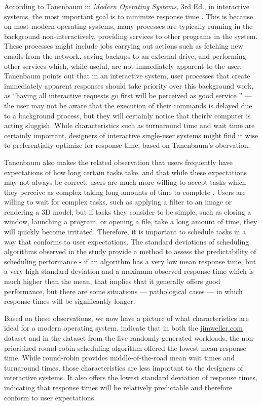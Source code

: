\documentclass[12pt,letterpaper]{article}
\begin{document}
  			According to Tanenbaum in \textit{Modern Operating Systems}, 3rd Ed., in interactive systems, the most important goal is to minimize response time \cite{tanenbaum2007modern}. This is because on most modern operating systems, many processes are typically running in the background non-interactively, providing services to other programs in the system. These processes might include jobs carrying out actions such as fetching new emails from the network, saving backups to an external drive, and performing other services which, while useful, are not immediately apparent to the user. Tanenbaum points out that in an interactive system, user processes that create immediately apparent responses should take priority over this background work, as ``having all interactive requests go first will be perceived as good service \cite{tanenbaum2007modern}'' --- the user may not be aware that the execution of their commands is delayed due to a background process, but they will certainly notice that theirlv computer is acting sluggish. While characteristics such as turnaround time and wait time are certainly important, designers of interactive single-user systems might find it wise to preferentially optimize for response time, based on Tanenbaum's obervation.

  			Tanenbaum also makes the related observation that users frequently have expectations of how long certain tasks take, and that while these expectations may not always be correct, users are much more willing to accept tasks which they perceive as complex taking long amounts of time to complete \cite{tanenbaum2007modern}. Users are willing to wait for complex tasks, such as applying a filter to an image or rendering a 3D model, but if tasks they consider to be simple, such as closing a window, launching a program, or opening a file, take a long amount of time, they will quickly become irritated. Therefore, it is important to schedule tasks in a way that conforms to user expectations. The standard deviations of scheduling algorithms observed in the study provide a method to assess the predictability of scheduling performance - if an algorithm has a very low mean response time, but a very high standard deviation and a maximum observed response time which is much higher than the mean, that implies that it generally offers good performance, but there are some situations --- pathological cases --- in which response times will be significantly longer.

  			Based on these observations, we now have a picture of what characteristics are ideal for a modern operating system.  indicate that in both the \url{jimweller.com} dataset and in the dataset from the five randomly-generated workloads, the non-prioritized round-robin scheduling algorithm offered the lowest mean response time. While round-robin provides middle-of-the-road mean wait times and turnaround times, those characteristics are less important to the designers of interactive systems. It also offers the lowest standard deviation of response times, indicating that response times will be relatively predictable and therefore conform to user expectations. 
\end{document}
